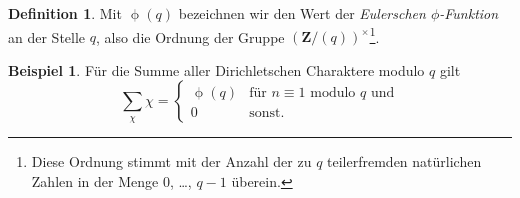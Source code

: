 \documentclass[a4paper,twoside,openright]{report}
\theoremstyle{definition}
\newtheorem{dfn}[thm]{Definition}
\newtheorem{xca}[thm]{Beispiel}
\theoremstyle{remark}
\DeclareMathOperator{\totient}{\phi}
\begin{document}
\begin{dfn}
  Mit $\totient(q)$ bezeichnen wir den Wert der \emph{Eulerschen $\phi$-Funktion} an
  der Stelle $q$, also die Ordnung der Gruppe $(\mathbf Z/(q))^\times$\footnote{Diese Ordnung stimmt mit der Anzahl der zu $q$ teilerfremden
  natürlichen Zahlen in der Menge $0$, \dots, $q - 1$ überein.}.
\end{dfn}

\begin{xca}
  Für die Summe aller Dirichletschen Charaktere modulo $q$ gilt
  \[
    \sum_\chi \chi = \begin{cases}
      \totient(q) & \text{für $n \equiv 1$ modulo $q$ und} \\
      0 & \text{sonst}.
    \end{cases}
  \]
\end{xca}
\end{document}
